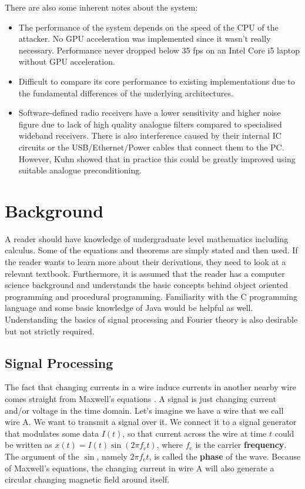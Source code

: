 \documentclass[a4paper,12pt,twoside,openright]{report}
\begin{document}
There are also some inherent notes about the system:
\begin{itemize}

  \item The performance of the system depends on the speed of the CPU of the attacker. No GPU acceleration was implemented since it wasn't really necessary. Performance never dropped below 35 fps on an Intel Core i5 laptop without GPU acceleration.
  \item Difficult to compare its core performance to existing implementations due to the fundamental differences of the underlying architectures.
  \item Software-defined radio receivers have a lower sensitivity and higher noise figure due to lack of high quality analogue filters compared to specialised wideband receivers. There is also interference caused by their internal IC circuits or the USB/Ethernet/Power cables that connect them to the PC. However, Kuhn showed that in practice this could be greatly improved using suitable analogue preconditioning.
  
\end{itemize}

\chapter{Background}

A reader should have knowledge of undergraduate level mathematics including calculus. Some of the equations and theorems are simply stated and then used. If the reader wants to learn more about their derivations, they need to look at a relevant textbook. Furthermore, it is assumed that the reader has a computer science background and understands the basic concepts behind object oriented programming and procedural programming. Familiarity with the C programming language and some basic knowledge of Java would be helpful as well. Understanding the basics of signal processing and Fourier theory is also desirable but not strictly required.

\section{Signal Processing} 

The fact that changing currents in a wire induce currents in another nearby wire comes straight from Maxwell's equations \cite{maxwell1881treatise}. A signal is just changing current and/or voltage in the time domain. Let's imagine we have a wire that we call wire A. We want to transmit a signal over it. We connect it to a signal generator that modulates some data $I(t)$, so that current across the wire at time $t$ could be written as $x(t) = I(t) \sin(2\pi f_\text{c} t)$, where $f_\text{c}$ is the carrier \textbf{frequency}. The argument of the $\sin$, namely $2\pi f_\text{c} t$, is called the \textbf{phase} of the wave. Because of Maxwell's equations, the changing current in wire A will also generate a circular changing magnetic field around itself.
\end{document}

